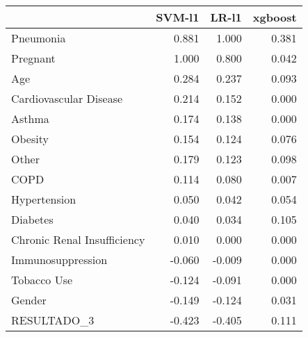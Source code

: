 \begin{tabular}{lrrr}
\toprule
{} &  SVM-l1 &  LR-l1 &  xgboost \\
\midrule
Pneumonia                   &   0.881 &  1.000 &    0.381 \\
Pregnant                    &   1.000 &  0.800 &    0.042 \\
Age                         &   0.284 &  0.237 &    0.093 \\
Cardiovascular Disease      &   0.214 &  0.152 &    0.000 \\
Asthma                      &   0.174 &  0.138 &    0.000 \\
Obesity                     &   0.154 &  0.124 &    0.076 \\
Other                       &   0.179 &  0.123 &    0.098 \\
COPD                        &   0.114 &  0.080 &    0.007 \\
Hypertension                &   0.050 &  0.042 &    0.054 \\
Diabetes                    &   0.040 &  0.034 &    0.105 \\
Chronic Renal Insufficiency &   0.010 &  0.000 &    0.000 \\
Immunosuppression           &  -0.060 & -0.009 &    0.000 \\
Tobacco Use                 &  -0.124 & -0.091 &    0.000 \\
Gender                      &  -0.149 & -0.124 &    0.031 \\
RESULTADO\_3                 &  -0.423 & -0.405 &    0.111 \\
\bottomrule
\end{tabular}

